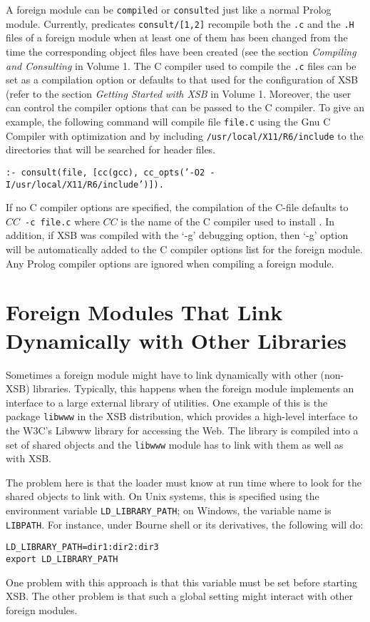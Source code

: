 A foreign module can be {\tt compile}d or {\tt consult}ed just like a
normal Prolog module.  Currently, predicates {\tt consult/[1,2]}
recompile both the {\tt *.c} and the {\tt *.H} files of a foreign
module when at least one of them has been changed from the time the
corresponding object files have been created (see the section {\it
Compiling and Consulting} in Volume 1. 
The C compiler used to compile the {\tt *.c} files can be set as a
compilation option or defaults to that used for the configuration of
XSB (refer to the section {\it Getting Started with XSB} in Volume 1.
Moreover, the user can control the compiler options that can be passed
to the C compiler.  To give an example, the following command will
compile file {\tt file.c} using the Gnu C Compiler with optimization
and by including {\tt /usr/local/X11/R6/include} to the directories that
will be searched for header files.
\begin{center}
{\tt  :- consult(file,
                 [cc(gcc), cc\_opts('-O2 -I/usr/local/X11/R6/include')]). }
\end{center}
If no C compiler options are specified, the compilation of the C-file
defaults to $CC$~{\tt -c~file.c} where $CC$ is the name of the C compiler
used to install \ourprolog.
In addition, if XSB was compiled with the `-g' debugging option, then `-g'
option will be automatically added to the C compiler options list for the
foreign module. Any Prolog compiler options are ignored when compiling a
foreign module.

\section{Foreign Modules That Link Dynamically with Other Libraries}

Sometimes a foreign module might have to link dynamically with other
(non-XSB) libraries. Typically, this happens when the foreign module
implements an interface to a large external library of utilities.
One example of this is the package {\tt libwww} in the XSB distribution,
which provides a high-level interface to the W3C's Libwww library for
accessing the Web. The library is compiled into a set of shared objects and
the {\tt libwww} module has to link with them as well as with XSB.

The problem here is that the loader must know at run time where to look for
the shared objects to link with. On Unix systems, this is specified using
the environment variable {\tt LD\_LIBRARY\_PATH}; on Windows, the variable
name is {\tt LIBPATH}. For instance, 
under Bourne shell or its derivatives, the following will do:
\begin{verbatim}
LD_LIBRARY_PATH=dir1:dir2:dir3
export LD_LIBRARY_PATH
\end{verbatim}
One problem with this approach is that this variable must be set before
starting XSB. The other problem is that such a global setting might
interact with other foreign modules.

